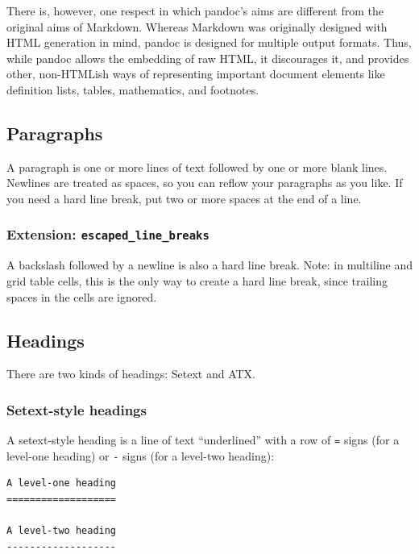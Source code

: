 \documentclass[
]{article}
\begin{document}
There is, however, one respect in which pandoc's aims are different from
the original aims of Markdown. Whereas Markdown was originally designed
with HTML generation in mind, pandoc is designed for multiple output
formats. Thus, while pandoc allows the embedding of raw HTML, it
discourages it, and provides other, non-HTMLish ways of representing
important document elements like definition lists, tables, mathematics,
and footnotes.

\hypertarget{paragraphs}{%
\subsection{Paragraphs}\label{paragraphs}}

A paragraph is one or more lines of text followed by one or more blank
lines. Newlines are treated as spaces, so you can reflow your paragraphs
as you like. If you need a hard line break, put two or more spaces at
the end of a line.

\hypertarget{extension-escaped_line_breaks}{%
\subsubsection{\texorpdfstring{Extension:
\texttt{escaped\_line\_breaks}}{Extension: escaped\_line\_breaks}}\label{extension-escaped_line_breaks}}

A backslash followed by a newline is also a hard line break. Note: in
multiline and grid table cells, this is the only way to create a hard
line break, since trailing spaces in the cells are ignored.

\hypertarget{headings}{%
\subsection{Headings}\label{headings}}

There are two kinds of headings: Setext and ATX.

\hypertarget{setext-style-headings}{%
\subsubsection{Setext-style headings}\label{setext-style-headings}}

A setext-style heading is a line of text ``underlined'' with a row of
\texttt{=} signs (for a level-one heading) or \texttt{-} signs (for a
level-two heading):

\begin{verbatim}
A level-one heading
===================

A level-two heading
-------------------
\end{verbatim}
\end{document}
